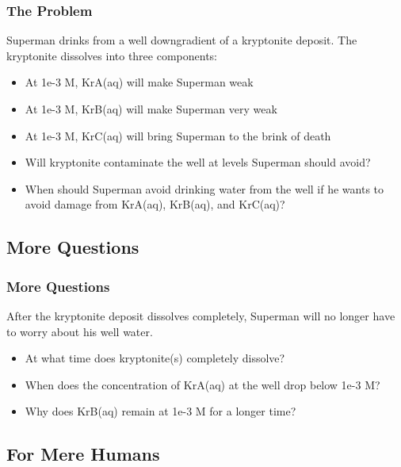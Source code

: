 \documentclass{beamer}
\newcommand\greencomment[1]{{{\color{green} #1}}}
\begin{document}
\begin{frame}[fragile]\frametitle{The Problem}
Superman drinks from a well downgradient of a kryptonite deposit. The kryptonite dissolves into three components:

\begin{itemize}
  \item At 1e-3 M, \greencomment{KrA(aq)} will make Superman weak
  \item At 1e-3 M, \greencomment{KrB(aq)} will make Superman very weak
  \item At 1e-3 M, \greencomment{KrC(aq)} will bring Superman to the brink of death
\end{itemize}

\begin{itemize}
  \item Will kryptonite contaminate the well at levels Superman should avoid?
  \item When should Superman avoid drinking water from the well if he wants to avoid damage from \greencomment{KrA(aq)}, \greencomment{KrB(aq)}, and \greencomment{KrC(aq)}?
\end{itemize}

\end{frame}

\subsection{More Questions}

\begin{frame}[fragile]\frametitle{More Questions}
After the kryptonite deposit dissolves completely, Superman will no longer have to worry about his well water.

\begin{itemize}
  \item At what time does \greencomment{kryptonite(s)} completely dissolve?
  \item When does the concentration of \greencomment{KrA(aq)} at the well drop below 1e-3 M?
  \item Why does \greencomment{KrB(aq)} remain at 1e-3 M for a longer time?
\end{itemize}

\end{frame}

\subsection{For Mere Humans}
\end{document}
